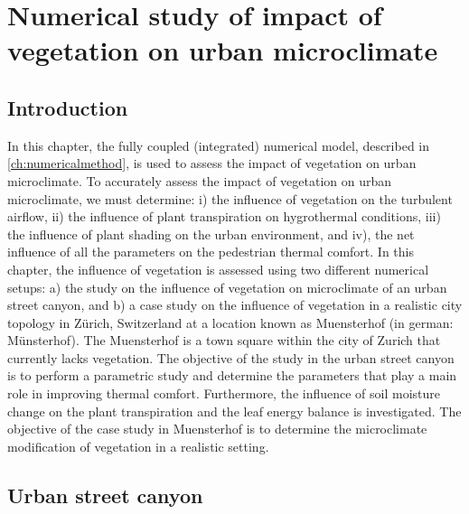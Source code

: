 \chapter{Numerical study of impact of vegetation on urban microclimate}
\label{ch:impactofvegetation}
\def\figdir{chapters/ch08_numericalstudy/figures}	

%		

\section{Introduction}

In this chapter, the fully coupled (integrated) numerical model, described in \cref{ch:numericalmethod}, is used to assess the impact of vegetation on urban microclimate. To accurately assess the impact of vegetation on urban microclimate, we must determine: i) the influence of vegetation on the turbulent airflow, ii) the influence of plant transpiration on hygrothermal conditions, iii) the influence of plant shading on the urban environment, and iv), the net influence of all the parameters on the pedestrian thermal comfort. In this chapter, the influence of vegetation is assessed using two different numerical setups: a) the study on the influence of vegetation on microclimate of an urban street canyon, and b) a case study on the influence of vegetation in a realistic city topology in Z\"urich, Switzerland at a location known as Muensterhof (in german: M\"unsterhof). The Muensterhof is a town square within the city of Zurich that currently lacks vegetation. The objective of the study in the urban street canyon is to perform a parametric study and determine the parameters that play a main role in improving thermal comfort. Furthermore, the influence of soil moisture change on the plant transpiration and the leaf energy balance is investigated. The objective of the case study in Muensterhof is to determine the microclimate modification of vegetation in a realistic setting.

\section{Urban street canyon}

